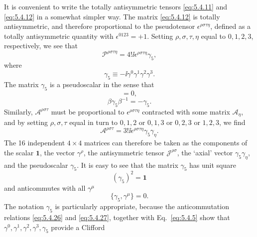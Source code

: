 It is convenient to write the totally antisymmetric tensors \eqref{eq:5.4.11} and
\eqref{eq:5.4.12} in a somewhat simpler way. The matrix \eqref{eq:5.4.12} is totally
antisymmetric, and therefore proportional to the pseudotensor
$\epsilon^{\rho\sigma\tau\eta}$, defined as a totally antisymmetric quantity
with $\epsilon^{0123}=+1$. Setting $\rho,\sigma,\tau,\eta$ equal to $0,1,2,3$,
respectively, we see that
\begin{equation}
\mathcal{P}^{\rho\sigma\tau\eta}=4!\ii\epsilon^{\rho\sigma\tau\eta}\gamma_5,
\tag{5.4.21}\label{eq:5.4.21}
\end{equation}
where
\begin{equation}
\gamma_5\equiv-\ii\gamma^0\gamma^1\gamma^2\gamma^3.
\tag{5.4.22}\label{eq:5.4.22}
\end{equation}
The matrix $\gamma_5$ is a pseudoscalar in the sense that
\begin{equation}
[\mathcal{J}^{\rho\sigma},\gamma_5]=0,
\tag{5.4.23}\label{eq:5.4.23}
\end{equation}
\begin{equation}
\beta\gamma_5\beta^{-1}=-\gamma_5.
\tag{5.4.24}\label{eq:5.4.24}
\end{equation}
Similarly, $\mathcal{A}^{\rho\sigma\tau}$ must be proportional to
$\epsilon^{\rho\sigma\tau\eta}$ contracted with some matrix $\mathcal{A}_\eta$,
and by setting $\rho,\sigma,\tau$ equal in turn to $0,1,2$ or $0,1,3$ or
$0,2,3$ or $1,2,3$, we find
\begin{equation}
\mathcal{A}^{\rho\sigma\tau}=3!\ii\epsilon^{\rho\sigma\tau\eta}\gamma_5\gamma_\eta.
\tag{5.4.25}\label{eq:5.4.25}
\end{equation}
The 16 independent $4\times4$ matrices can therefore be taken as the
components of the scalar $\mathbf{1}$, the vector $\gamma^\rho$, the
antisymmetric tensor $\mathcal{J}^{\rho\sigma}$, the `axial' vector
$\gamma_5\gamma_\eta$, and the pseudoscalar $\gamma_5$. It is easy to see that
the matrix $\gamma_5$ has unit square
\begin{equation}
(\gamma_5)^2=\mathbf{1}
\tag{5.4.26}\label{eq:5.4.26}
\end{equation}
and anticommutes with all $\gamma^\mu$
\begin{equation}
\{\gamma_5,\gamma^\mu\}=0.
\tag{5.4.27}\label{eq:5.4.27}
\end{equation}
The notation $\gamma_5$ is particularly appropriate, because the
anticommutation relations \eqref{eq:5.4.26} and \eqref{eq:5.4.27}, together with Eq.~\eqref{eq:5.4.5}
show that $\gamma^0,\gamma^1,\gamma^2,\gamma^3,\gamma_5$ provide a Clifford
